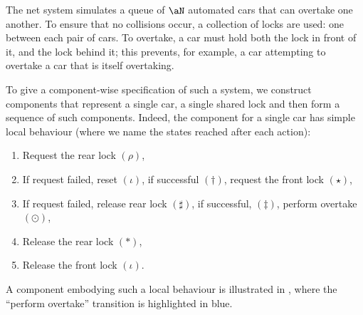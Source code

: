 The \overtakeSys{\aN} net system simulates a queue of $\aN$ automated cars that
can overtake one another. To ensure that no collisions occur, a collection of
locks are used: one between each pair of cars. To overtake, a car must hold
both the lock in front of it, and the lock behind it; this prevents, for
example, a car attempting to overtake a car that is itself overtaking.

To give a component-wise specification of such a system, we construct
components that represent a single car, a single shared lock and then form a
sequence of such components. Indeed, the component for a single car has simple
local behaviour (where we name the states reached after each action):
\begin{enumerate}
    \item Request the rear lock $(\rho)$,
    \item If request failed, reset $(\iota)$, if successful $(\dagger)$,
        request the front lock $(\star)$,
    \item If request failed, release rear lock $(\sharp)$, if successful,
        $(\ddagger)$, perform overtake $(\odot)$,
    \item Release the rear lock $(\ast)$,
    \item Release the front lock $(\iota)$.
\end{enumerate}

A component embodying such a local behaviour is illustrated in
, where the ``perform overtake'' transition is highlighted in
blue.


